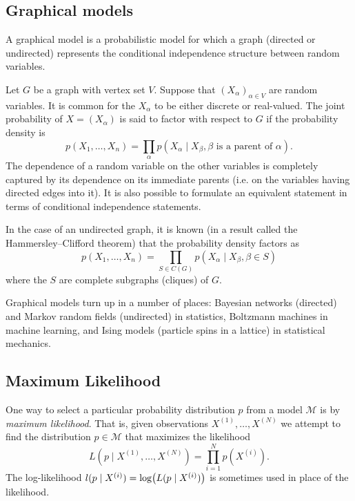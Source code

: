 \documentclass[11pt,titlepage]{article}
\newcommand*{\Mod}{\mathcal{M}}
\begin{document}
\subsection{Graphical models}

    A graphical model is a probabilistic model for which a graph (directed or
    undirected) represents the conditional independence structure between random
    variables. 

    Let $G$ be a graph with vertex set $V$.  Suppose that $(X_\alpha)_{\alpha
    \in V}$ are random variables.  It is common for the $X_\alpha$ to be either
    discrete or real-valued.  The joint probability of $X = (X_\alpha)$ is said
    to factor with respect to $G$ if the probability density is
    \[
        p(X_1, \ldots, X_n) = 
            \prod_\alpha p(X_\alpha \mid X_\beta, \beta \text{ is a parent of }
            \alpha).
    \]
    The dependence of a random variable on the other variables is completely
    captured by its dependence on its immediate parents (i.e. on the variables
    having directed edges into it).  It is also possible to formulate an
    equivalent statement in terms of conditional independence statements.

    In the case of an undirected graph, it is known (in a result called the
    Hammersley–Clifford theorem) that the probability density factors as
    \[
        p(X_1, \ldots, X_n) = 
            \prod_{S \in C(G)} p(X_\alpha \mid X_\beta, \beta \in S)
    \]
    where the $S$ are complete subgraphs (cliques) of $G$.

    Graphical models turn up in a number of places: Bayesian networks (directed)
    and Markov random fields (undirected) in statistics, Boltzmann machines in
    machine learning, and Ising models (particle spins in a lattice) in
    statistical mechanics.

\subsection{Maximum Likelihood}

    One way to select a particular probability distribution $p$ from a model
    $\Mod$ is by \emph{maximum likelihood}.  That is, given observations
    $X^{(1)}, \ldots, X^{(N)}$ we attempt to find the distribution $p \in \Mod$
    that maximizes the likelihood
    \[
        L(p \mid X^{(1)}, \ldots, X^{(N)}) = \prod_{i=1}^N p(X^{(i)}).
    \]
    The log-likelihood $l(p \mid X^{(i)}) = \log\pdil[\big]{L(p \mid X^{(i)})}$
    is sometimes used in place of the likelihood.
\end{document}
